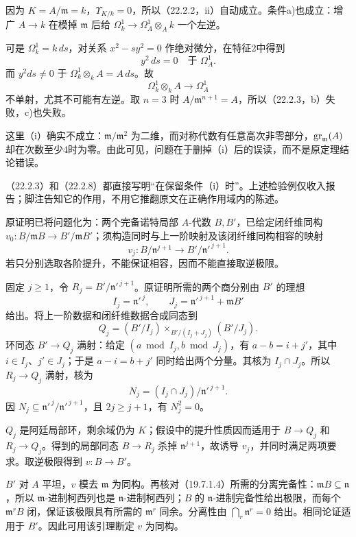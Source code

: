 因为 $K=A/\mathfrak m=k$，$\Upsilon_{K/k}=0$，所以（22.2.2，ii）自动成立。条件a)也成立：增广 $A\to k$ 在模掉 $\mathfrak m$ 后给 $\Omega^1_k\to\Omega^1_A\otimes_A k$ 一个左逆。

可是 $\Omega^1_k=k\,ds$，对关系 $x^2-sy^2=0$ 作绝对微分，在特征2中得到
\[
 y^2\,ds=0\quad\text{于 }\Omega^1_A.
\]
而 $y^2ds\ne0$ 于 $\Omega^1_k\otimes_k A=A\,ds$。故
\[
 \Omega^1_k\otimes_k A\longrightarrow\Omega^1_A
\]
不单射，尤其不可能有左逆。取 $n=3$ 时 $A/\mathfrak m^{n+1}=A$，所以（22.2.3，b）失败，c)也失败。

这里（i）确实不成立：$\mathfrak m/\mathfrak m^2$ 为二维，而对称代数有任意高次非零部分，$\operatorname{gr}_{\mathfrak m}(A)$ 却在次数至少4时为零。由此可见，问题在于删掉（i）后的误读，而不是原定理结论错误。

（22.2.3）和（22.2.8）都直接写明“在保留条件（i）时”。上述检验例仅收入报告；脚注告知它的作用，不用它推翻原文在正确作用域内的陈述。

原证明已将问题化为：两个完备诺特局部 $A$-代数 $B,B'$，已给定闭纤维同构 $v_0:B/\mathfrak mB\to B'/\mathfrak mB'$；须构造同时与上一阶映射及该闭纤维同构相容的映射
\[
 v_j:B/\mathfrak n^{j+1}\longrightarrow B'/\mathfrak n'^{\,j+1}.
\]
若只分别选取各阶提升，不能保证相容，因而不能直接取逆极限。

固定 $j\ge1$，令 $R_j=B'/\mathfrak n'^{\,j+1}$。原证明所需的两个商分别由 $B'$ 的理想
\[
 I_j=\mathfrak n'^{\,j},\qquad
 J_j=\mathfrak n'^{\,j+1}+\mathfrak mB'
\]
给出。将上一阶数据和闭纤维数据合成同态到
\[
 Q_j=(B'/I_j)\mathop{\times}_{B'/(I_j+J_j)}(B'/J_j).
\]
环同态 $B'\to Q_j$ 满射：给定 $(a\bmod I_j,b\bmod J_j)$，有 $a-b=i+j'$，其中 $i\in I_j$、$j'\in J_j$；于是 $a-i=b+j'$ 同时给出两个分量。其核为 $I_j\cap J_j$。所以 $R_j\to Q_j$ 满射，核为
\[
 N_j=(I_j\cap J_j)/\mathfrak n'^{\,j+1}.
\]
因 $N_j\subseteq\mathfrak n'^{\,j}/\mathfrak n'^{\,j+1}$，且 $2j\ge j+1$，有 $N_j^2=0$。

$Q_j$ 是阿廷局部环，剩余域仍为 $K$；假设中的提升性质因而适用于 $B\to Q_j$ 和 $R_j\to Q_j$。得到的局部同态 $B\to R_j$ 杀掉 $\mathfrak n^{j+1}$，故诱导 $v_j$，并同时满足两项要求。取逆极限得到 $v:B\to B'$。

$B'$ 对 $A$ 平坦，$v$ 模去 $\mathfrak m$ 为同构。再核对（19.7.1.4）所需的分离完备性：$\mathfrak mB\subseteq\mathfrak n$，所以 $\mathfrak m$-进制柯西列也是 $\mathfrak n$-进制柯西列；$B$ 的 $\mathfrak n$-进制完备性给出极限，而每个 $\mathfrak m^rB$ 闭，保证该极限具有所需的 $\mathfrak m^r$ 同余。分离性由 $\bigcap_r\mathfrak n^r=0$ 给出。相同论证适用于 $B'$。因此可用该引理断定 $v$ 为同构。

